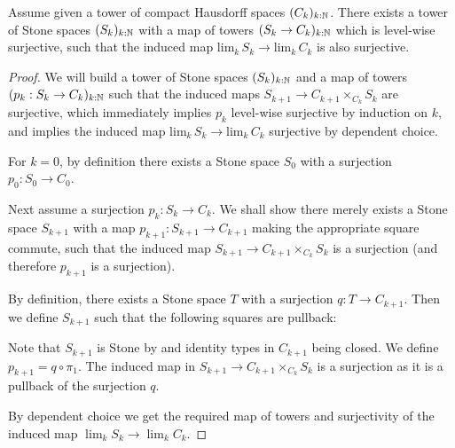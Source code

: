 \begin{lemma}\label{sequential-limit-Hausdorff}
Assume given a tower of compact Hausdorff spaces $(C_k)_{k:\mathbb{N}}$. There exists a tower of Stone spaces $(S_k)_{k:\mathbb{N}}$ with a map of towers $(S_k\to C_k)_{k:\mathbb{N}}$ which is level-wise surjective, such that the induced map $\mathrm{lim}_k\,S_k\to \mathrm{lim}_k\,C_k$ is also surjective.



\end{lemma}

\begin{proof}
We will build a tower of Stone spaces $(S_k)_{k:\mathbb{N}}$ and a map of towers $(p_k:S_k\to C_k)_{k:\mathbb{N}}$ such that the induced maps $S_{k+1}\to C_{k+1}\times_{C_k}S_k$ are surjective, which immediately implies $p_k$ level-wise surjective by induction on $k$, and implies the induced map $\mathrm{lim}_k\,S_k\to \mathrm{lim}_k\,C_k$ surjective by dependent choice.

For $k=0$, by definition there exists a Stone space $S_0$ with a surjection $p_0:S_0\to C_0$. 

Next assume a surjection $p_k:S_k\to C_k$. We shall show there merely exists a Stone space $S_{k+1}$ with a map $p_{k+1}:S_{k+1}\to C_{k+1}$ making the appropriate square commute, such that the induced map $S_{k+1}\to C_{k+1}\times_{C_k} S_k$ is a surjection (and therefore $p_{k+1}$ is a surjection).

By definition, there exists a Stone space $T$ with a surjection $q:T \to C_{k+1}$. Then we define $S_{k+1}$ such that the following squares are pullback:
\begin{center}
\end{center}
Note that $S_{k+1}$ is Stone by  and identity types in $C_{k+1}$ being closed.
We define $p_{k+1} = q\circ \pi_1$. The induced map in $S_{k+1}\to C_{k+1}\times_{C_k} S_k$ is a surjection as it is a pullback of the surjection $q$. 

By dependent choice we get the required map of towers and surjectivity of the induced map $\lim_kS_k \to \lim_kC_k$. 
\end{proof}

